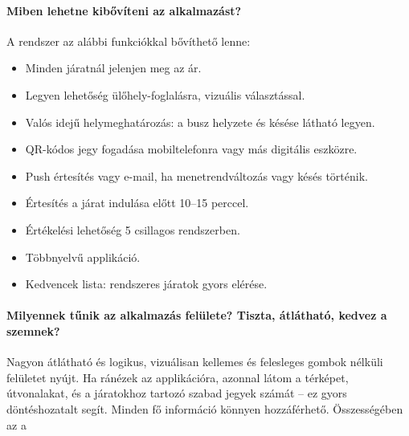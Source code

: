 \paragraph*{Miben lehetne kibővíteni az alkalmazást?}
A rendszer az alábbi funkciókkal bővíthető lenne:
\begin{itemize}
    \item Minden járatnál jelenjen meg az ár.
    \item Legyen lehetőség ülőhely-foglalásra, vizuális választással.
    \item Valós idejű helymeghatározás: a busz helyzete és késése látható legyen.
    \item QR-kódos jegy fogadása mobiltelefonra vagy más digitális eszközre.
    \item Push értesítés vagy e-mail, ha menetrendváltozás vagy késés történik.
    \item Értesítés a járat indulása előtt 10–15 perccel.
    \item Értékelési lehetőség 5 csillagos rendszerben.
    \item Többnyelvű applikáció.
    \item Kedvencek lista: rendszeres járatok gyors elérése.
\end{itemize}

\paragraph*{Milyennek tűnik az alkalmazás felülete? Tiszta, átlátható, kedvez a szemnek?}
Nagyon átlátható és logikus, vizuálisan kellemes és felesleges gombok nélküli felületet nyújt. Ha ránézek az applikációra, azonnal látom a térképet, útvonalakat, és a járatokhoz tartozó szabad jegyek számát – ez gyors döntéshozatalt segít. Minden fő információ könnyen hozzáférhető. Összességében az a

